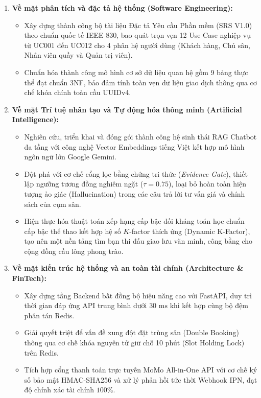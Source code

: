 \begin{enumerate}[label=\arabic*)]
    \item \textbf{Về mặt phân tích và đặc tả hệ thống (Software Engineering):}
    \begin{itemize}
        \item Xây dựng thành công bộ tài liệu Đặc tả Yêu cầu Phần mềm (SRS V1.0) theo chuẩn quốc tế IEEE 830, bao quát trọn vẹn 12 Use Case nghiệp vụ từ UC001 đến UC012 cho 4 phân hệ người dùng (Khách hàng, Chủ sân, Nhân viên quầy và Quản trị viên).
        \item Chuẩn hóa thành công mô hình cơ sở dữ liệu quan hệ gồm 9 bảng thực thể đạt chuẩn 3NF, bảo đảm tính toàn vẹn dữ liệu giao dịch thông qua cơ chế khóa chính toàn cầu UUIDv4.
    \end{itemize}
    \item \textbf{Về mặt Trí tuệ nhân tạo và Tự động hóa thông minh (Artificial Intelligence):}
    \begin{itemize}
        \item Nghiên cứu, triển khai và đóng gói thành công hệ sinh thái RAG Chatbot đa tầng với công nghệ Vector Embeddings tiếng Việt kết hợp mô hình ngôn ngữ lớn Google Gemini.
        \item Đột phá với cơ chế cổng lọc bằng chứng tri thức (\textit{Evidence Gate}), thiết lập ngưỡng tương đồng nghiêm ngặt ($\tau = 0.75$), loại bỏ hoàn toàn hiện tượng ảo giác (Hallucination) trong các câu trả lời tư vấn giá và chính sách của cụm sân.
        \item Hiện thực hóa thuật toán xếp hạng cấp bậc đối kháng toán học chuẩn cấp bậc thể thao kết hợp hệ số $K$-factor thích ứng (Dynamic K-Factor), tạo nên một nền tảng tìm bạn thi đấu giao lưu văn minh, công bằng cho cộng đồng cầu lông phong trào.
    \end{itemize}
    \item \textbf{Về mặt kiến trúc hệ thống và an toàn tài chính (Architecture \& FinTech):}
    \begin{itemize}
        \item Xây dựng tầng Backend bất đồng bộ hiệu năng cao với FastAPI, duy trì thời gian đáp ứng API trung bình dưới $30\text{ ms}$ khi kết hợp cùng bộ đệm phân tán Redis.
        \item Giải quyết triệt để vấn đề xung đột đặt trùng sân (Double Booking) thông qua cơ chế khóa nguyên tử giữ chỗ 10 phút (Slot Holding Lock) trên Redis.
        \item Tích hợp cổng thanh toán trực tuyến MoMo All-in-One API với cơ chế ký số bảo mật HMAC-SHA256 và xử lý phản hồi tức thời Webhook IPN, đạt độ chính xác tài chính $100\%$.

\end{itemize}
\end{enumerate}
